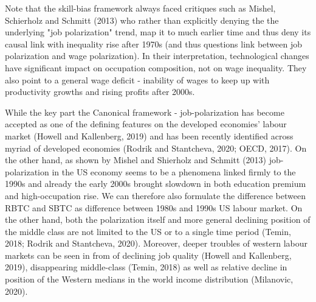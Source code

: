 \documentclass{article}
\begin{document}
Note that the skill-bias framework always faced critiques such as Mishel, Schierholz and Schmitt (2013) who rather than explicitly denying the the underlying "job polarization" trend, map it to much earlier time and thus deny its causal link with inequality rise after 1970s (and thus questions link between job polarization and wage polarization). In their interpretation, technological changes have significant impact on occupation composition, not on wage inequality. They also point to a general wage deficit - inability of wages to keep up with productivity growths and rising profits after 2000s.

While the key part the Canonical framework - job-polarization has become accepted as one of the defining features on the developed economies' labour market (Howell and Kallenberg, 2019) and has been recently identified across myriad of developed economies (Rodrik and Stantcheva, 2020; OECD, 2017). On the other hand, as shown by Mishel and Shierholz and Schmitt (2013) job-polarization in the US economy seems to be a phenomena linked firmly to the 1990s and already the early 2000s brought slowdown in both education premium and high-occupation rise. We can therefore also formulate the difference between RBTC and SBTC as difference between 1980s and 1990s US labour market. On the other hand, both the polarization itself and more general declining position of the middle class are not limited to the US or to a single time period (Temin, 2018; Rodrik and Stantcheva, 2020). Moreover, deeper troubles of western labour markets can be seen in from of declining job quality (Howell and Kallenberg, 2019), disappearing middle-class (Temin, 2018) as well as relative decline in position of the Western medians in the world income distribution (Milanovic, 2020).
\end{document}
